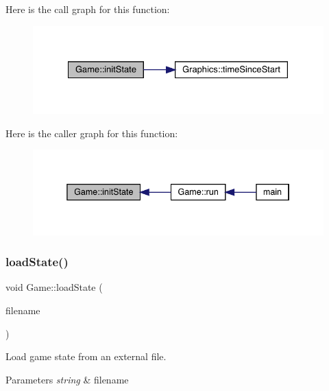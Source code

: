 Here is the call graph for this function\+:\nopagebreak
\begin{figure}[H]
\begin{center}
\leavevmode
\includegraphics[width=328pt]{class_game_a741532226fb50fd8113b0e2a0f162858_cgraph}
\end{center}
\end{figure}
Here is the caller graph for this function\+:\nopagebreak
\begin{figure}[H]
\begin{center}
\leavevmode
\includegraphics[width=338pt]{class_game_a741532226fb50fd8113b0e2a0f162858_icgraph}
\end{center}
\end{figure}
\mbox{\label{class_game_a89e4124211cd2158244b9860b46c4767}} 
\subsubsection{\texorpdfstring{load\+State()}{loadState()}}
{\footnotesize\ttfamily void Game\+::load\+State (\begin{DoxyParamCaption}\item[{string}]{filename }\end{DoxyParamCaption})}



Load game state from an external file. 


\begin{DoxyParams}{Parameters}
{\em string} & filename \\
\hline
\end{DoxyParams}
\mbox{\label{class_game_a1ab78f5ed0d5ea879157357cf2fb2afa}} 
